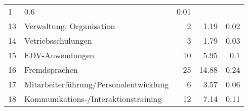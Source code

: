\begin{longtable}{lXrrr}
       \num{1} &
       \num[round-mode=places,round-precision=2]{0,6} &
         \num[round-mode=places,round-precision=2]{0,01} \\

     13 &
     \multicolumn{1}{X}{ Verwaltung, Organisation   } &


       \num{2} &
       \num[round-mode=places,round-precision=2]{1,19} &
         \num[round-mode=places,round-precision=2]{0,02} \\

     14 &
     \multicolumn{1}{X}{ Vetriebsschulungen   } &


       \num{3} &
       \num[round-mode=places,round-precision=2]{1,79} &
         \num[round-mode=places,round-precision=2]{0,03} \\

     15 &
     \multicolumn{1}{X}{ EDV-Anwendungen   } &


       \num{10} &
       \num[round-mode=places,round-precision=2]{5,95} &
         \num[round-mode=places,round-precision=2]{0,1} \\

     16 &
     \multicolumn{1}{X}{ Fremdsprachen   } &


       \num{25} &
       \num[round-mode=places,round-precision=2]{14,88} &
         \num[round-mode=places,round-precision=2]{0,24} \\

     17 &
     \multicolumn{1}{X}{ Mitarbeiterführung/Personalentwicklung   } &


       \num{6} &
       \num[round-mode=places,round-precision=2]{3,57} &
         \num[round-mode=places,round-precision=2]{0,06} \\

     18 &
     \multicolumn{1}{X}{ Kommunikations-/Interaktionstraining   } &


       \num{12} &
       \num[round-mode=places,round-precision=2]{7,14} &
         \num[round-mode=places,round-precision=2]{0,11} \\


\end{longtable}
